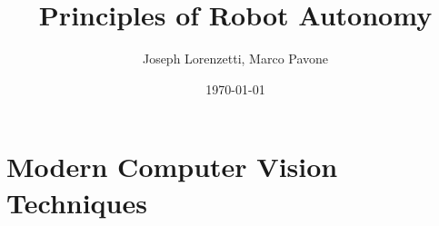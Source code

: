 \documentclass[nohyper,nobib]{tufte-book}
\title{Principles of Robot Autonomy}
\author{Joseph Lorenzetti, Marco Pavone}
\date{\today}
\begin{document}
\chapter{Modern Computer Vision Techniques}


\printbibliography
\end{document}

